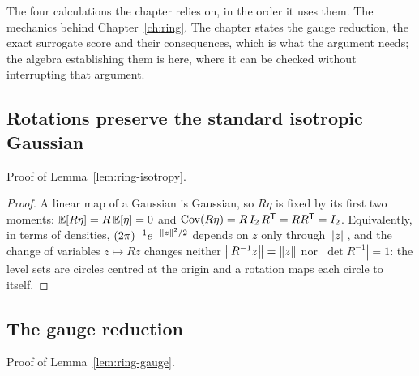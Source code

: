 The four calculations the chapter relies on, in the order it uses them.
The mechanics behind Chapter~\ref{ch:ring}. The chapter states the gauge
reduction, the exact surrogate score and their consequences, which is what the
argument needs; the algebra establishing them is here, where it can be checked
without interrupting that argument.

\subsection{Rotations preserve the standard isotropic Gaussian}

Proof of Lemma~\ref{lem:ring-isotropy}.

\begin{proof}
A linear map of a Gaussian is Gaussian, so $R\eta$ is fixed by its first two
moments: $\mathbb{E}[R\eta] = R\,\mathbb{E}[\eta] = 0$ and
$\mathrm{Cov}(R\eta) = R\, I_2\, R^{\mathsf{T}} = R R^{\mathsf{T}} = I_2$. Equivalently, in
terms of densities, $(2\pi)^{-1}e^{-\left\lVert z \right\rVert^2/2}$ depends on $z$ only through
$\left\lVert z \right\rVert$, and the change of variables $z \mapsto Rz$ changes neither
$\left\lVert R^{-1}z \right\rVert = \left\lVert z \right\rVert$ nor $|\det R^{-1}| = 1$: the level sets are circles
centred at the origin and a rotation maps each circle to itself.
\end{proof}

\subsection{The gauge reduction}

Proof of Lemma~\ref{lem:ring-gauge}.

